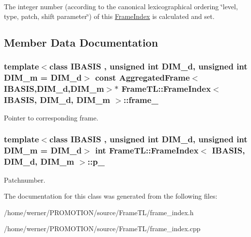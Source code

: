 The integer number (according to the canonical lexicographical ordering \char`\"{}level, type, patch, shift parameter\char`\"{}) of this \hyperlink{classFrameTL_1_1FrameIndex}{FrameIndex} is calculated and set. 

\subsection{Member Data Documentation}
\hypertarget{classFrameTL_1_1FrameIndex_93c3120c2ff5468dcfb8af0dfe53efd3}{
\subsubsection[{frame\_\-}]{\setlength{\rightskip}{0pt plus 5cm}template$<$class IBASIS , unsigned int DIM\_\-d, unsigned int DIM\_\-m = DIM\_\-d$>$ const {\bf AggregatedFrame}$<$IBASIS,DIM\_\-d,DIM\_\-m$>$$\ast$ {\bf FrameTL::FrameIndex}$<$ IBASIS, DIM\_\-d, DIM\_\-m $>$::{\bf frame\_\-}}}
\label{classFrameTL_1_1FrameIndex_93c3120c2ff5468dcfb8af0dfe53efd3}


Pointer to corresponding frame. \hypertarget{classFrameTL_1_1FrameIndex_570736897b9ce68ba01a9feccbc5ffc9}{
\subsubsection[{p\_\-}]{\setlength{\rightskip}{0pt plus 5cm}template$<$class IBASIS , unsigned int DIM\_\-d, unsigned int DIM\_\-m = DIM\_\-d$>$ int {\bf FrameTL::FrameIndex}$<$ IBASIS, DIM\_\-d, DIM\_\-m $>$::{\bf p\_\-}}}
\label{classFrameTL_1_1FrameIndex_570736897b9ce68ba01a9feccbc5ffc9}


Patchnumber. 

The documentation for this class was generated from the following files:\begin{CompactItemize}
\item 
/home/werner/PROMOTION/source/FrameTL/frame\_\-index.h\item 
/home/werner/PROMOTION/source/FrameTL/frame\_\-index.cpp\end{CompactItemize}
